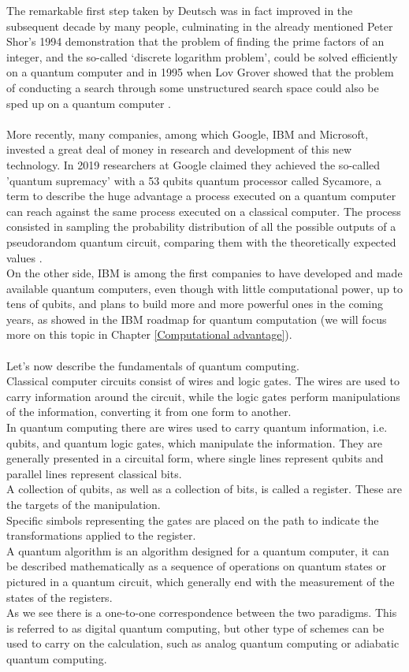 The remarkable first step taken by Deutsch was in fact improved in the subsequent decade by many people, culminating in the already mentioned Peter Shor’s 1994 demonstration that the problem of finding the prime factors of an integer, and the so-called ‘discrete logarithm problem', could be solved efficiently on a quantum computer \cite{Shor1994Nov} and in 1995 when Lov Grover showed that the problem of conducting a search through some unstructured search space could also be sped up on a quantum computer \cite{Grover1996Jul}. \\
\\
More recently, many companies, among which Google, IBM and Microsoft, invested a great deal of money in research and development of this new technology. In 2019 researchers at Google claimed they achieved the so-called 'quantum supremacy' with a 53 qubits quantum processor called Sycamore, a term to describe the huge advantage a process executed on a quantum computer can reach against the same process executed on a classical computer. The process consisted in sampling the probability distribution of all the possible outputs of a pseudorandom quantum circuit, comparing them with the theoretically expected values \cite{Arute2019Oct}. \\
On the other side, IBM is among the first companies to have developed and made available quantum computers, even though with little computational power, up to tens of qubits, and plans to build more and more powerful ones in the coming years, as showed in the IBM roadmap for quantum computation (we will focus more on this topic in Chapter \ref{Computational advantage}). \\
\\
Let's now describe the fundamentals of quantum computing. \\
Classical computer circuits consist of wires and logic gates. The wires are used to carry information around the circuit, while the logic gates perform manipulations of the information, converting it from one form to another. \\
In quantum computing there are wires used to carry quantum information, i.e. qubits, and quantum logic gates, which manipulate the information. They are generally presented in a circuital form, where single lines represent qubits and parallel lines represent classical bits. \\
A collection of qubits, as well as a collection of bits, is called a register. These are the targets of the manipulation. \\
Specific simbols representing the gates are placed on the path to indicate the transformations applied to the register. \\
A quantum algorithm is an algorithm designed for a quantum computer, it can be described mathematically as a sequence of operations on quantum states or pictured in a quantum circuit, which generally end with the measurement of the states of the registers. \\
As we see there is a one-to-one correspondence between the two paradigms. This is referred to as digital quantum computing, but other type of schemes can be used to carry on the calculation, such as analog quantum computing or adiabatic quantum computing.

